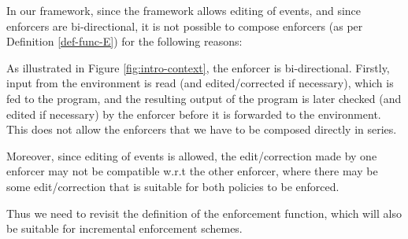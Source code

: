 {In our framework, since the framework allows editing of events, and since enforcers are bi-directional, it is not possible to compose enforcers (as per Definition \ref{def-func-E}) for the following reasons: 

\squishlist
\item As illustrated in Figure \ref{fig:intro-context}, the enforcer is bi-directional. Firstly, input from the environment is read (and edited/corrected if necessary), which is fed to the program, and the resulting output of the program is later checked (and edited if necessary) by the enforcer before it is forwarded to the environment. This does not allow the enforcers that we have to be composed directly in series. 
\item Moreover, since editing of events is allowed, the edit/correction made by one enforcer may not be compatible w.r.t the other enforcer, where there may be some edit/correction that is suitable for both policies to be enforced.  
\squishend

Thus we need to revisit the definition of the enforcement function, which will also be suitable for incremental enforcement schemes.}

